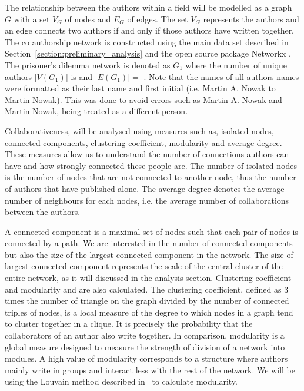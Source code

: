 \documentclass{article}
\theoremstyle{definition}
\newcommand{\authors}{}
\newcommand{\edges}{}
\begin{document}
The relationship between the authors within a field will be modelled as a graph \(G\) with
a set \(V_G\) of nodes and \(E_G\) of edges. The set \(V_G\) represents the authors
and an edge connects two authors if and only if those authors have written together.
The co authorship network is constructed using the main data set described in
Section~\ref{section:preliminary_analysis} and the open source package Networkx
\cite{networkx}. The prisoner's dilemma network is denoted as \(G_1\) where the
number of unique authors \(|V(G_1)|\) is \authors and \(|E(G_1)|=\) \edges.
Note that the names of all authors names were formatted as their last name and
first initial (i.e. Martin A. Nowak to Martin Nowak). This was done to avoid errors
such as Martin A. Nowak and Martin Nowak, being treated as a different person.

Collaborativeness, will be analysed using measures such as, isolated nodes,
connected components, clustering coefficient, modularity and average degree.
These measures allow us to understand the number of connections authors can have
and how strongly connected these people are. The number of isolated nodes is the
number of nodes that are not connected to another node, thus the
number of authors that have published alone. The average degree denotes the average
number of neighbours for each nodes, i.e. the average number of collaborations
between the authors.

A connected component is a maximal set of nodes such that each pair of nodes is
connected by a path. We are interested in the number of connected components
but also the size of the largest connected component in the network.
The size of largest connected component represents the scale of the central cluster
of the entire network, as it will discussed in the analysis section.
Clustering coefficient and modularity and are also calculated. The clustering
coefficient, defined as 3 times the number of triangle on the graph divided
by the number of connected triples of nodes,
is a local measure of the degree to which nodes in a graph tend to cluster together
in a clique. It is precisely the probability that the collaborators
of an author also write together. In comparison, modularity is a global measure
designed to measure the strength of division of a network into modules. A high
value of modularity corresponds to a structure where authors mainly write
in groups and interact less with the rest of the network. We will be using the
Louvain method described in~\cite{Blondel2008} to calculate modularity.
\end{document}
